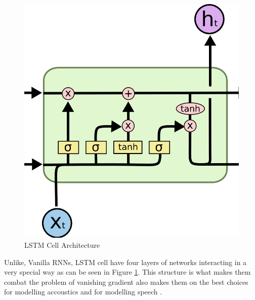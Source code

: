 \documentclass[letterpaper, 10 pt, conference]{ieeeconf}  %
\begin{document}
\begin{figure}[!h]
\centering
\includegraphics[scale=0.40]{../figs/lstm/diagram.png}	
\caption{LSTM Cell Architecture}
\label{fig:LSTM_Arch} 
\end{figure}

Unlike, Vanilla RNNs, LSTM cell \cite{lstm_intro} have four layers of networks interacting in a very special way as can be seen in Figure \ref{fig:LSTM_Arch}. This structure is what makes them combat the problem of vanishing gradient also makes them on the best choices for modelling accoustics \cite{google_accoustics} and for modelling speech \cite{google_speech}.
\end{document}
